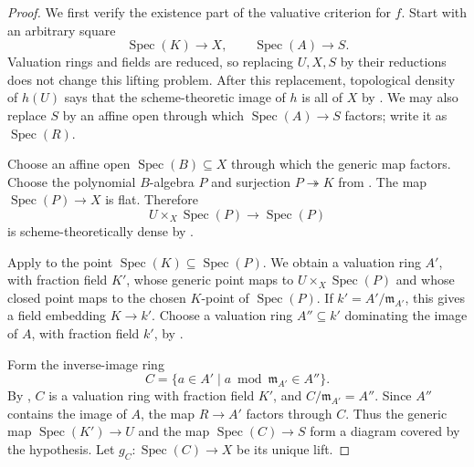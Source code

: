 \begin{proof}
  We first verify the existence part of the valuative criterion for \(f\).
  Start with an arbitrary square
  \[
    \operatorname{Spec}(K)\longrightarrow X,
    \qquad
    \operatorname{Spec}(A)\longrightarrow S.
  \]
  Valuation rings and fields are reduced, so replacing \(U,X,S\) by their
  reductions does not change this lifting problem.  After this replacement,
  topological density of \(h(U)\) says that the scheme-theoretic image of
  \(h\) is all of \(X\) by
  .  We may also replace
  \(S\) by an affine open through
  which \(\operatorname{Spec}(A)\to S\) factors; write it as
  \(\operatorname{Spec}(R)\).

  Choose an affine open \(\operatorname{Spec}(B)\subseteq X\) through which
  the generic map factors.  Choose the polynomial $B$-algebra $P$ and
  surjection $P\twoheadrightarrow K$ from
  .  The map
  \(\operatorname{Spec}(P)\to X\) is flat.  Therefore
  \[
    U\times_X\operatorname{Spec}(P)\longrightarrow\operatorname{Spec}(P)
  \]
  is scheme-theoretically dense by
  .

  Apply  to the point
  \(\operatorname{Spec}(K)\subseteq\operatorname{Spec}(P)\).  We obtain a
  valuation ring \(A'\), with fraction field \(K'\), whose generic point maps
  to \(U\times_X\operatorname{Spec}(P)\) and whose closed point maps to the
  chosen \(K\)-point of \(\operatorname{Spec}(P)\).  If
  \(k'=A'/\mathfrak m_{A'}\), this gives a field embedding
  \(K\to k'\).  Choose a valuation ring \(A''\subseteq k'\) dominating the
  image of \(A\), with fraction field \(k'\), by
  .

  Form the inverse-image ring
  \[
    C=\{a\in A'\mid a\bmod\mathfrak m_{A'}\in A''\}.
  \]
  By , \(C\) is a valuation ring
  with fraction field \(K'\), and \(C/\mathfrak m_{A'}=A''\).  Since
  \(A''\) contains the image of \(A\), the map \(R\to A'\) factors through
  \(C\).  Thus the generic map
  \(\operatorname{Spec}(K')\to U\) and the map
  \(\operatorname{Spec}(C)\to S\) form a diagram covered by the hypothesis.
  Let \(g_C\colon\operatorname{Spec}(C)\to X\) be its unique lift.


\end{proof}
